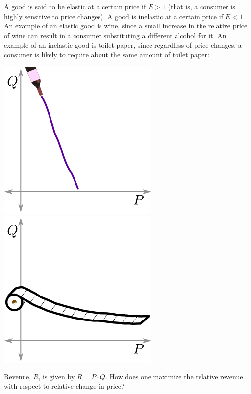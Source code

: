 \documentclass[twoside,openright,titlepage,a4paper]{book}
\begin{document}
\begin{sloppypar}
A good is said to be elastic at a certain price if $E>1$ (that is, a consumer is highly sensitive to price changes). A good is inelastic at a certain price if $E<1$. An example of an elastic good is wine, since a small increase in the relative price of wine can result in a consumer substituting a different alcohol for it. An example of an inelastic good is toilet paper, since regardless of price changes, a consumer is likely to require about the same amount of toilet paper:
\begin{center}
	\includegraphics[scale=0.6]{WineElasticity}
	\includegraphics[scale=0.6]{TPElasticity}
\end{center}

Revenue, $R$, is given by $R = P \cdot Q$. How does one maximize the relative revenue with respect to relative change in price?


\end{sloppypar}
\end{document}
